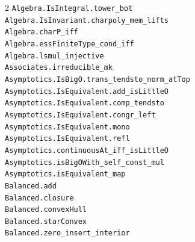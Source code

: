 \documentclass[10pt,a4paper]{article}
\begin{document}
\begin{multicols}{2}
\texttt{Algebra.\allowbreak{}IsIntegral.\allowbreak{}tower\_bot} \\
\texttt{Algebra.\allowbreak{}IsInvariant.\allowbreak{}charpoly\_mem\_lifts} \\
\texttt{Algebra.\allowbreak{}charP\_iff} \\
\texttt{Algebra.\allowbreak{}essFiniteType\_cond\_iff} \\
\texttt{Algebra.\allowbreak{}lsmul\_injective} \\
\texttt{Associates.\allowbreak{}irreducible\_mk} \\
\texttt{Asymptotics.\allowbreak{}IsBigO.\allowbreak{}trans\_tendsto\_norm\_atTop} \\
\texttt{Asymptotics.\allowbreak{}IsEquivalent.\allowbreak{}add\_isLittleO} \\
\texttt{Asymptotics.\allowbreak{}IsEquivalent.\allowbreak{}comp\_tendsto} \\
\texttt{Asymptotics.\allowbreak{}IsEquivalent.\allowbreak{}congr\_left} \\
\texttt{Asymptotics.\allowbreak{}IsEquivalent.\allowbreak{}mono} \\
\texttt{Asymptotics.\allowbreak{}IsEquivalent.\allowbreak{}refl} \\
\texttt{Asymptotics.\allowbreak{}continuousAt\_iff\_isLittleO} \\
\texttt{Asymptotics.\allowbreak{}isBigOWith\_self\_const\_mul} \\
\texttt{Asymptotics.\allowbreak{}isEquivalent\_map} \\
\texttt{Balanced.\allowbreak{}add} \\
\texttt{Balanced.\allowbreak{}closure} \\
\texttt{Balanced.\allowbreak{}convexHull} \\
\texttt{Balanced.\allowbreak{}starConvex} \\
\texttt{Balanced.\allowbreak{}zero\_insert\_interior} \\

\end{multicols}
\end{document}
